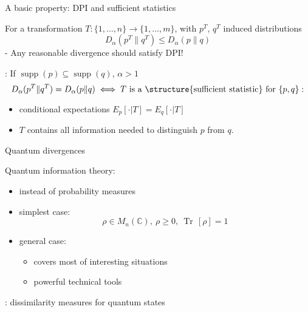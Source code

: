 \documentclass[mathserif]{beamer}
\newcommand{\<}{\langle}
\renewcommand{\>}{\rangle}
\newcommand{\supp}{\operatorname{supp}}
\newcommand{\Tr}{\operatorname{Tr}\,}
\begin{document}
\begin{frame}{A basic property: DPI and sufficient statistics}

 For a transformation 
\vskip 2mm
$T:\{1,\dots,n\}\to
\{1,\dots,m\}$, with $p^T$, $q^T$ induced distributions
\[
D_\alpha(p^T\|q^T)\le D_\alpha(p\|q)
\]
\hskip 5mm - Any reasonable divergence should satisfy DPI!

\bigskip
{}: If $\supp(p)\subseteq \supp(q)$, $\alpha>1$
\[
D_\alpha(p^T\|q^T)=D_\alpha(p\|q)
\iff T \text{ is a \structure{sufficient statistic} for }\{p,q\}:
\]
\begin{itemize}
\item conditional expectations $E_p[\cdot |T]=E_q[\cdot |T]$

\item $T$ contains all information needed to distinguish $p$ from $q$.
\end{itemize}


\end{frame}

\begin{frame}{Quantum divergences}


Quantum information theory:  

\medskip
\begin{itemize}
\item {} instead of probability measures
\vskip 2mm
\item simplest case: 
\[
\rho\in M_n(\mathbb C),\ \rho\ge 0,\ \Tr[\rho]=1
\]
\item general case: 
\vskip 2mm
\begin{itemize}
\item covers most of interesting situations
\vskip 2mm
\item powerful technical tools

\end{itemize}

\end{itemize}

\medskip

: dissimilarity measures for quantum states

\end{frame}
\end{document}
